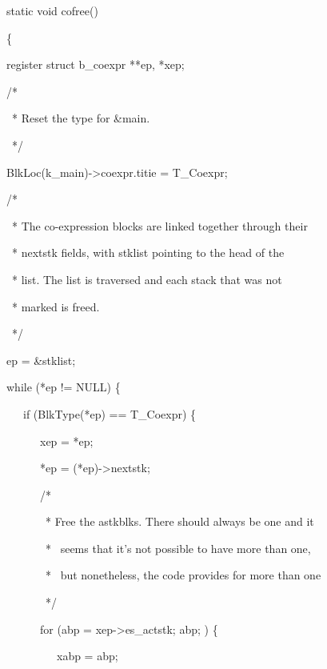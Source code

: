 {\ttfamily\mdseries
\ \ \ static void cofree()}

{\ttfamily\mdseries
\ \ \ \{}

{\ttfamily\mdseries
\ \ \ register struct b\_coexpr **ep, *xep;}


\bigskip

{\ttfamily\mdseries
\ \ \ /*}

{\ttfamily\mdseries
\ \ \ \ * Reset the type for \&main.}

{\ttfamily\mdseries
\ \ \ \ */}

{\ttfamily\mdseries
\ \ \ BlkLoc(k\_main)-{\textgreater}coexpr.titie = T\_Coexpr;}

{\ttfamily\mdseries
\ \ \ /*}

{\ttfamily\mdseries
\ \ \ \ * The co-expression blocks are linked together through their}

{\ttfamily\mdseries
\ \ \ \ * nextstk fields, with stklist pointing to the head of the}

{\ttfamily\mdseries
\ \ \ \ * list. The list is traversed and each stack that was not}

{\ttfamily\mdseries
\ \ \ \ * marked is freed.}

{\ttfamily\mdseries
\ \ \ \ */}

{\ttfamily\mdseries
\ \ \ ep = \&stklist;}

{\ttfamily\mdseries
\ \ \ while (*ep != NULL) \{}

{\ttfamily\mdseries
\ \ \ \ \ \ if (BlkType(*ep) == T\_Coexpr) \{}

{\ttfamily\mdseries
\ \ \ \ \ \ \ \ \ xep = *ep;}

{\ttfamily\mdseries
\ \ \ \ \ \ \ \ \ *ep = (*ep)-{\textgreater}nextstk;}

{\ttfamily\mdseries
\ \ \ \ \ \ \ \ \ /*
}

{\ttfamily\mdseries
\ \ \ \ \ \ \ \ \ \ * Free the astkblks. There should always be one and it}

{\ttfamily\mdseries
\ \ \ \ \ \ \ \ \ \ * \ seems that it's not possible to have more than one,}

{\ttfamily\mdseries
\ \ \ \ \ \ \ \ \ \ * \ but nonetheless, the code provides for more than one}

{\ttfamily\mdseries
\ \ \ \ \ \ \ \ \ \ */
}

{\ttfamily\mdseries
\ \ \ \ \ \ \ \ \ for (abp = xep-{\textgreater}es\_actstk; abp; ) \{
}

{\ttfamily\mdseries
\ \ \ \ \ \ \ \ \ \ \ \ xabp = abp;
}

